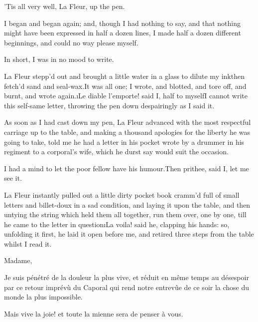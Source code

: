\documentclass[twoside]{article}
\begin{document}
\tsk ’Tis all very well, La Fleur,\break
{}
up the pen.


I began and began again; and, though I had nothing to say, and that
nothing might have been expressed in half a dozen lines, I made half a
dozen different beginnings, and could no way please myself.

In short, I was in no mood to write.

La Fleur stepp’d out and brought a little water in a glass to dilute my
ink\tsk then fetch’d sand and seal-wax.\tsk It was all one; I wrote, and
blotted, and tore off, and burnt, and wrote again.\tsk \i{Le diable l’emporte!}
said I, half to myself\tsk I cannot write this self-same letter, throwing
the pen down despairingly as I said it.

As soon as I had cast down my pen, La Fleur advanced with the most
respectful carriage up to the table, and making a thousand apologies for
the liberty he was going to take, told me he had a letter in his pocket
wrote by a drummer in his regiment to a corporal’s wife, which he durst
say would suit the occasion.

I had a mind to let the poor fellow have his humour.\tsk Then prithee, said
I, let me see it.

La Fleur instantly pulled out a little dirty pocket book cramm’d full of
small letters and billet-doux in a sad condition, and laying it upon the
table, and then untying the string which held them all together, run them
over, one by one, till he came to the letter in question\tsk \i{La voila!}
said he, clapping his hands: so, unfolding it first, he laid it open
before me, and retired three steps from the table whilst I read it.






Madame,

Je suis pénétré de la douleur la plus vive, et réduit en même temps au
désespoir par ce retour imprévù du Caporal qui rend notre entrevûe de ce
soir la chose du monde la plus impossible.

Mais vive la joie! et toute la mienne sera de penser à vous.
\end{document}
